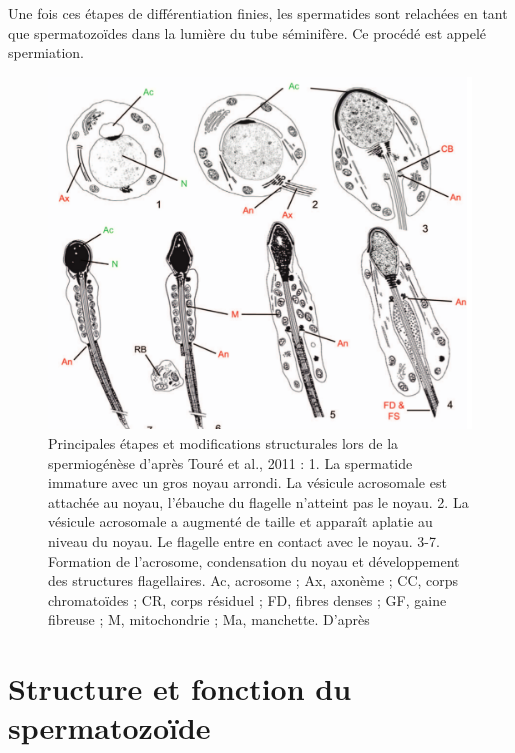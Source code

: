 \documentclass[12pt,twoside]{reedthesis}
\theoremstyle{definition}
\theoremstyle{definition}
\theoremstyle{remark}
\begin{document}
  Une fois ces étapes de différentiation finies, les spermatides sont
  relachées en tant que spermatozoïdes dans la lumière du tube séminifère.
  Ce procédé est appelé spermiation.
  
  \begin{figure}
  
  {\centering \includegraphics[scale=0.3]{figure/spermiogenese} 
  
  }
  
  \caption[Principales étapes et modifications structurales lors de la spermiogénèse]{Principales étapes et modifications structurales lors de la spermiogénèse d'après Touré et al., 2011 : 1. La spermatide immature avec un gros noyau arrondi. La vésicule acrosomale est attachée au noyau, l’ébauche du flagelle n’atteint pas le noyau. 2. La vésicule acrosomale a augmenté de taille et apparaît aplatie au niveau du noyau. Le flagelle entre en contact avec le noyau. 3-7. Formation de l’acrosome, condensation du noyau et développement des structures flagellaires. Ac, acrosome ; Ax, axonème ; CC, corps chromatoïdes ; CR, corps résiduel ; FD, fibres denses ; GF, gaine fibreuse ; M, mitochondrie ; Ma, manchette. D’après }\label{fig:spermiogenese}
  \end{figure}
  
  \newpage  
  
  \section{Structure et fonction du
  spermatozoïde}\label{structure-et-fonction-du-spermatozoide}
  
\end{document}
